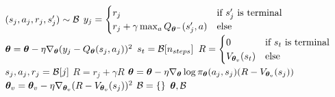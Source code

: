 \begin{algorithm}[t]
\begin{algorithmic}[1]
\Statex
	
    \State $(s_j, a_j, r_j, s_j') \sim {\mathcal{B}}$ 
    \State $y_j = \begin{cases} r_j & \text{if $s_j'$ is terminal} \\
                    r_j + \gamma \max_a Q_{{\bm{\theta}}^{-}}(s_j', a) & \text{else}  \end{cases} $
    \State ${\bm{\theta}} = {\bm{\theta}} - \eta \nabla_{{\bm{\theta}}}(y_j - Q_{{\bm{\theta}}}(s_j, a_j))^2$ 
    \State $s_t = {\mathcal{B}}[n_{steps}]$ 
    \State $R = \begin{cases} 0 & \text{if $s_t$ is terminal} \\
                    V_{{\bm{\theta}}_v}(s_t) & \text{else}  \end{cases} $
        \State $s_j, a_j, r_j = {\mathcal{B}}[j]$ 
        \State $R = r_j + \gamma R$
        \State ${\bm{\theta}} = {\bm{\theta}} - \eta \nabla_{{\bm{\theta}}} \log \pi_{{\bm{\theta}}}(a_j, s_j) (R - V_{{\bm{\theta}}_v}(s_j))$ 
        \State ${\bm{\theta}}_v = {\bm{\theta}}_v - \eta \nabla_{{\bm{\theta}}_v} (R - V_{{\bm{\theta}}_v}(s_j))^2$ 
    \EndFor
    \State ${\mathcal{B}} = \{\}$ 
\EndIf 
\State \Return ${\bm{\theta}}, {\mathcal{B}}$
\EndFunction

\end{algorithmic}
\end{algorithm}